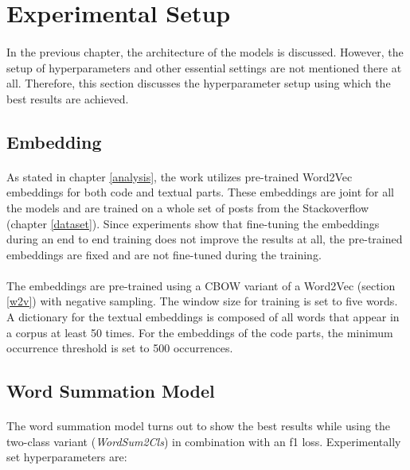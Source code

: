 \section{Experimental Setup}
\paragraph{}
In the previous chapter, the architecture of the models is discussed. However, the setup of hyperparameters and other essential settings are not mentioned there at all. Therefore, this section discusses the hyperparameter setup using which the best results are achieved.

\subsection{Embedding}
\paragraph{}
As stated in chapter \ref{analysis}, the work utilizes pre-trained Word2Vec embeddings for both code and textual parts. These embeddings are joint for all the models and are trained on a whole set of posts from the Stackoverflow (chapter \ref{dataset}). Since experiments show that fine-tuning the embeddings during an end to end training does not improve the results at all, the pre-trained embeddings are fixed and are not fine-tuned during the training.

\paragraph{}
The embeddings are pre-trained using a CBOW variant of a Word2Vec (section \ref{w2v}) with negative sampling. The window size for training is set to five words. A dictionary for the textual embeddings is composed of all words that appear in a corpus at least 50 times. For the embeddings of the code parts, the minimum occurrence threshold is set to 500 occurrences.


\subsection{Word Summation Model}
\paragraph{}
The word summation model turns out to show the best results while using the two-class variant (\textit{WordSum2Cls}) in combination with an f1 loss. Experimentally set hyperparameters are:

